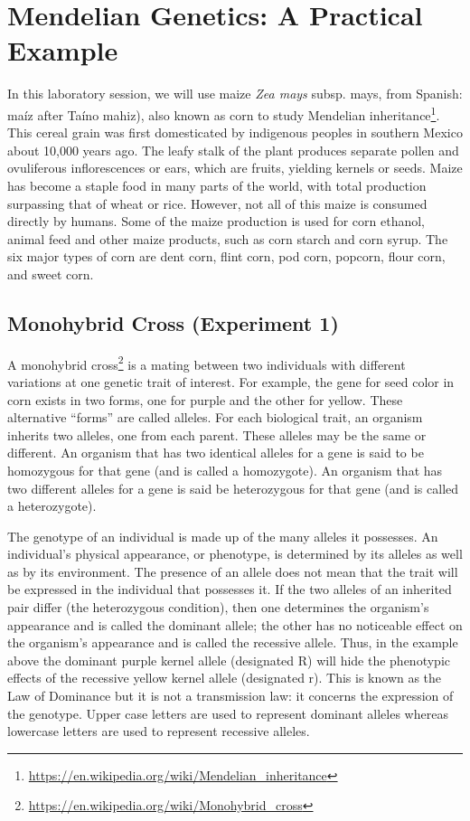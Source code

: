 \documentclass[]{book}
\let\rmarkdownfootnote\footnote%
\def\footnote{\protect\rmarkdownfootnote}
\renewcommand{\href}[2]{#2\footnote{\url{#1}}}
\theoremstyle{definition}
\theoremstyle{definition}
\theoremstyle{definition}
\theoremstyle{remark}
\begin{document}
\chapter{Mendelian Genetics: A Practical
Example}\label{mendelian-genetics-a-practical-example}

In this laboratory session, we will use maize \emph{Zea mays} subsp.
mays, from Spanish: maíz after Taíno mahiz), also known as corn to study
\href{https://en.wikipedia.org/wiki/Mendelian_inheritance}{Mendelian
inheritance}. This cereal grain was first domesticated by indigenous
peoples in southern Mexico about 10,000 years ago. The leafy stalk of
the plant produces separate pollen and ovuliferous inflorescences or
ears, which are fruits, yielding kernels or seeds. Maize has become a
staple food in many parts of the world, with total production surpassing
that of wheat or rice. However, not all of this maize is consumed
directly by humans. Some of the maize production is used for corn
ethanol, animal feed and other maize products, such as corn starch and
corn syrup. The six major types of corn are dent corn, flint corn, pod
corn, popcorn, flour corn, and sweet corn.

\section{Monohybrid Cross (Experiment
1)}\label{monohybrid-cross-experiment-1}

A \href{https://en.wikipedia.org/wiki/Monohybrid_cross}{monohybrid
cross} is a mating between two individuals with different variations at
one genetic trait of interest. For example, the gene for seed color in
corn exists in two forms, one for purple and the other for yellow. These
alternative ``forms'' are called alleles. For each biological trait, an
organism inherits two alleles, one from each parent. These alleles may
be the same or different. An organism that has two identical alleles for
a gene is said to be homozygous for that gene (and is called a
homozygote). An organism that has two different alleles for a gene is
said be heterozygous for that gene (and is called a heterozygote).

The genotype of an individual is made up of the many alleles it
possesses. An individual's physical appearance, or phenotype, is
determined by its alleles as well as by its environment. The presence of
an allele does not mean that the trait will be expressed in the
individual that possesses it. If the two alleles of an inherited pair
differ (the heterozygous condition), then one determines the organism's
appearance and is called the dominant allele; the other has no
noticeable effect on the organism's appearance and is called the
recessive allele. Thus, in the example above the dominant purple kernel
allele (designated R) will hide the phenotypic effects of the recessive
yellow kernel allele (designated r). This is known as the Law of
Dominance but it is not a transmission law: it concerns the expression
of the genotype. Upper case letters are used to represent dominant
alleles whereas lowercase letters are used to represent recessive
alleles.
\end{document}
